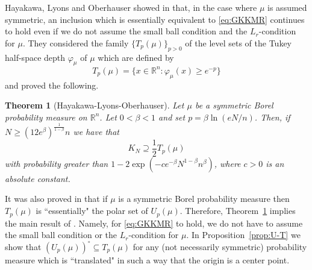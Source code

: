 \documentclass[11pt,leqno]{article}
\newtheorem{theorem}{Theorem}[section]
\theoremstyle{definition}
\theoremstyle{remark}
\numberwithin{equation}{section}
\newcommand{\gr}{\geqslant}
\newcommand{\1}{\textbf{1}}
\begin{document}
Hayakawa, Lyons and Oberhauser showed in \cite{HLO-2023} that, in the case where $\mu$ is assumed symmetric,
an inclusion which is essentially equivalent to \eqref{eq:GKKMR}
continues to hold even if we do not assume the small ball condition and the $L_r$-condition for $\mu$. They considered
the family $\{T_p(\mu)\}_{p>0}$ of the level sets of the Tukey half-space depth $\varphi_{\mu}$ of $\mu$
which are defined by
$$T_p(\mu)=\{x\in\mathbb{R}^n:\varphi_{\mu}(x)\gr e^{-p}\}$$
and proved the following.

\begin{theorem}[Hayakawa-Lyons-Oberhauser]\label{th:HLO}Let $\mu$ be a symmetric Borel probability measure
on $\mathbb{R}^n$. Let $0<\beta<1$ and set $p=\beta\ln(eN/n)$. Then, if $N\gr (12e^{\beta})^{\frac{1}{1-\beta}}n$
we have that \begin{equation}\label{eq:HLO}K_N\supseteq \frac{1}{2}T_p(\mu)\end{equation}
with probability greater than $1-2\exp(-ce^{-\beta}N^{1-\beta}n^{\beta})$, where $c>0$ is an absolute constant.
\end{theorem}

It was also proved in \cite{HLO-2023} that if $\mu$ is a symmetric Borel probability measure then
$T_p(\mu)$ is ``essentially" the polar set of $U_p(\mu)$. Therefore, Theorem~\ref{th:HLO} implies
the main result of \cite{GKKMR-2022}. Namely, for \eqref{eq:GKKMR} to hold, we do not have
to assume the small ball condition or the $L_r$-condition for $\mu$. In Proposition~\ref{prop:U-T}
we show that $(U_p(\mu))^{\circ}\subseteq T_p(\mu)$ for any (not necessarily symmetric) probability measure
which is ``translated" in such a way that the origin is a center point.
\end{document}
